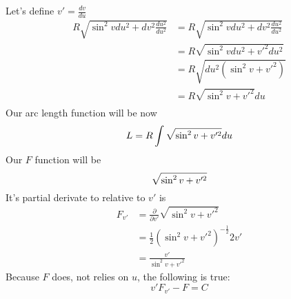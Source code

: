 Let's define $v' = \frac{dv}{du}$
\begin{equation}
\begin{aligned}
R \sqrt{\sin^2 v du^2 + dv^2 \frac{du^2}{du^2}} &= R \sqrt{\sin^2 v du^2 + dv^2 \frac{du^2}{du^2}}\\
&= R \sqrt{\sin^2 v du^2 + v'^2 du^2}\\
&= R \sqrt{du^2(\sin^2 v + v'^2)}\\
&= R \sqrt{\sin^2 v + v'^2} du\\
\end{aligned}
\end{equation}
Our arc length function will be now
\begin{equation}
L = R \int \sqrt{\sin^2 v + v'^2} du\\
\end{equation}
Our $F$ function will be
\begin{equation}
 \sqrt{\sin^2 v + v'^2}\\
\end{equation}
It's partial derivate to relative to $v'$ is
\begin{equation}
\begin{aligned}
 F_{v'} &= \frac{\partial}{\partial v'} \sqrt{\sin^2 v + v'^2}\\
 &= \frac{1}{2} (\sin^2 v + v'^2)^{-\frac{1}{2}} 2v'\\
 &= \frac{v'}{\sin^2 v + v'^2}
\end{aligned}
\end{equation}
Because $F$ does, not relies on $u$, the following is true:
\begin{equation}
v'F_{v'} - F = C
\end{equation}